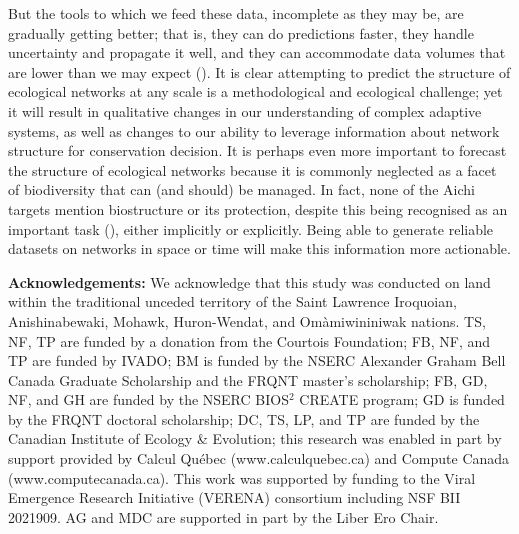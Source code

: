 \begin{refsection}
But the tools to which we feed these data, incomplete as they may be,
are gradually getting better; that is, they can do predictions faster,
they handle uncertainty and propagate it well, and they can accommodate
data volumes that are lower than we may expect (\cite{Pichler2020Machine}).
It is clear attempting to predict the structure of ecological networks
at any scale is a methodological and ecological challenge; yet it will
result in qualitative changes in our understanding of complex adaptive
systems, as well as changes to our ability to leverage information about
network structure for conservation decision. It is perhaps even more
important to forecast the structure of ecological networks because it is
commonly neglected as a facet of biodiversity that can (and should) be
managed. In fact, none of the Aichi targets mention biostructure or its
protection, despite this being recognised as an important task
(\cite{McCann2007Protecting}), either implicitly or explicitly. Being able to
generate reliable datasets on networks in space or time will make this
information more actionable.

\textbf{Acknowledgements:} We acknowledge that this study was conducted
on land within the traditional unceded territory of the Saint Lawrence
Iroquoian, Anishinabewaki, Mohawk, Huron-Wendat, and Omàmiwininiwak
nations. TS, NF, TP are funded by a donation from the Courtois
Foundation; FB, NF, and TP are funded by IVADO; BM is funded by the
NSERC Alexander Graham Bell Canada Graduate Scholarship and the FRQNT
master's scholarship; FB, GD, NF, and GH are funded by the NSERC
BIOS\(^2\) CREATE program; GD is funded by the FRQNT doctoral
scholarship; DC, TS, LP, and TP are funded by the Canadian Institute of
Ecology \& Evolution; this research was enabled in part by support
provided by Calcul Québec (www.calculquebec.ca) and Compute Canada
(www.computecanada.ca). This work was supported by funding to the Viral
Emergence Research Initiative (VERENA) consortium including NSF BII
2021909. AG and MDC are supported in part by the Liber Ero Chair.

\printbibliography{}
\end{refsection}

\endinput
